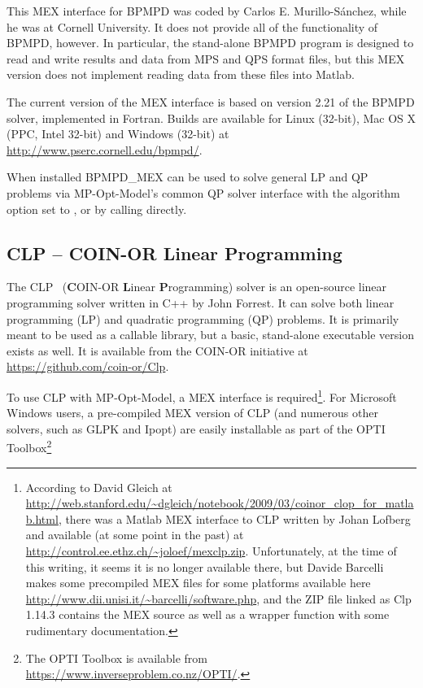 \documentclass[12pt]{article}
\newcommand{\matlab}[0]{{\sc Matlab}}
\newcommand{\mpom}[0]{\mbox{MP-Opt-Model}}
\newcommand{\ipopt}[0]{{\sc Ipopt}}
\newcommand{\clp}[0]{{CLP}}
\newcommand{\glpk}[0]{{GLPK}}
\newcommand{\code}[1]{{\relsize{-0.5}{\tt{{#1}}}}}  %
\newcommand{\codeq}[1]{\code{\textquotesingle{}#1\textquotesingle}}  %
\numberwithin{equation}{section}
\numberwithin{table}{section}
\numberwithin{figure}{section}
\begin{document}
\begin{appendices}
This MEX interface for BPMPD was coded by Carlos E. Murillo-S{\'a}nchez, while he was at Cornell University. It does not provide all of the functionality of BPMPD, however. In particular, the stand-alone BPMPD program is designed to read and write results and data from MPS and QPS format files, but this MEX version does not implement reading data from these files into \matlab{}.

The current version of the MEX interface is based on version 2.21 of the BPMPD solver, implemented in Fortran. Builds are available for Linux (32-bit), Mac OS X (PPC, Intel 32-bit) and Windows (32-bit) at \url{http://www.pserc.cornell.edu/bpmpd/}.

When installed BPMPD\_MEX can be used to solve general LP and QP problems via \mpom{}'s common QP solver interface \code{qps\_master} with the algorithm option set to \codeq{BPMPD}, or by calling \code{qps\_bpmpd} directly.

\subsection{\clp{} -- COIN-OR Linear Programming}
\label{app:clp}

The \clp{}~\cite{clp} ({\bf C}OIN-OR {\bf L}inear {\bf P}rogramming) solver is an open-source linear programming solver written in C++ by John Forrest. It can solve both linear programming (LP) and quadratic programming (QP) problems. It is primarily meant to be used as a callable library, but a basic, stand-alone executable version exists as well. It is available from the COIN-OR initiative at \url{https://github.com/coin-or/Clp}.

To use \clp{} with \mpom{}, a MEX interface is required\footnote{According to David Gleich at \url{http://web.stanford.edu/~dgleich/notebook/2009/03/coinor_clop_for_matlab.html}, there was a \matlab{} MEX interface to \clp{} written by Johan Lofberg and available (at some point in the past) at \url{http://control.ee.ethz.ch/~joloef/mexclp.zip}. Unfortunately, at the time of this writing, it seems it is no longer available there, but Davide Barcelli makes some precompiled MEX files for some platforms available here \url{http://www.dii.unisi.it/~barcelli/software.php}, and the ZIP file linked as Clp 1.14.3 contains the MEX source as well as a \code{clp.m} wrapper function with some rudimentary documentation.}. For Microsoft Windows users, a pre-compiled MEX version of \clp{} (and numerous other solvers, such as \glpk{} and \ipopt{}) are easily installable as part of the OPTI Toolbox\footnote{The OPTI Toolbox is available from
\url{https://www.inverseproblem.co.nz/OPTI/}.}~\cite{opti}


\end{appendices}
\end{document}
